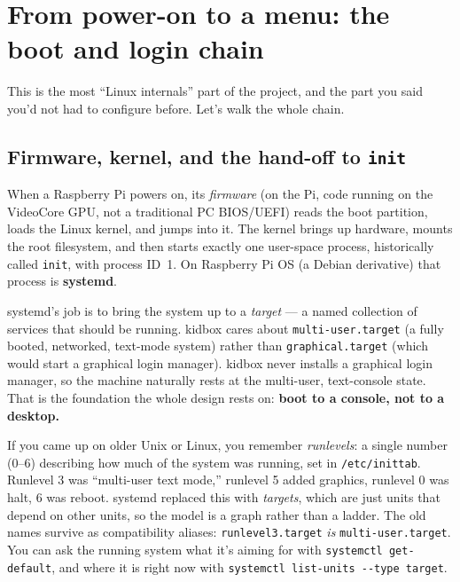 \documentclass[11pt,oneside]{article}
\newcommand{\file}[1]{\textcolor{kbteal}{\texttt{#1}}}
\begin{document}
\section{From power-on to a menu: the boot and login chain}

This is the most ``Linux internals'' part of the project, and the part you said
you'd not had to configure before. Let's walk the whole chain.

\subsection{Firmware, kernel, and the hand-off to \texttt{init}}

When a Raspberry Pi powers on, its \emph{firmware} (on the Pi, code running on
the VideoCore GPU, not a traditional PC BIOS/UEFI) reads the boot partition,
loads the Linux kernel, and jumps into it. The kernel brings up hardware,
mounts the root filesystem, and then starts exactly one user-space process,
historically called \texttt{init}, with process ID~1. On Raspberry Pi OS (a
Debian derivative) that process is \textbf{systemd}.

systemd's job is to bring the system up to a \emph{target} --- a named
collection of services that should be running. kidbox cares about
\texttt{multi-user.target} (a fully booted, networked, text-mode system) rather
than \texttt{graphical.target} (which would start a graphical login manager).
kidbox never installs a graphical login manager, so the machine naturally rests
at the multi-user, text-console state. That is the foundation the whole design
rests on: \textbf{boot to a console, not to a desktop.}

\begin{deeper}
If you came up on older Unix or Linux, you remember \emph{runlevels}: a single
number (0--6) describing how much of the system was running, set in
\file{/etc/inittab}. Runlevel 3 was ``multi-user text mode,'' runlevel 5 added
graphics, runlevel 0 was halt, 6 was reboot. systemd replaced this with
\emph{targets}, which are just units that depend on other units, so the model
is a graph rather than a ladder. The old names survive as compatibility
aliases: \texttt{runlevel3.target} \emph{is} \texttt{multi-user.target}. You can
ask the running system what it's aiming for with \texttt{systemctl
get-default}, and where it is right now with \texttt{systemctl
list-units -{}-type target}.
\end{deeper}
\end{document}
